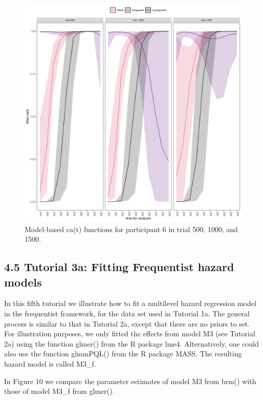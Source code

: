 \documentclass[
  man,floatsintext]{apa6}
\begin{document}
\begin{figure}[H]

{\centering \includegraphics[width=0.8\linewidth,height=0.67\textheight,]{../Tutorial_2_Bayesian/figures/M4_ca_effects_subject6} 

}

\caption{Model-based ca(t) functions for participant 6 in trial 500, 1000, and 1500.}\label{fig:plot-ca-subject6}
\end{figure}

\subsection{4.5 Tutorial 3a: Fitting Frequentist hazard models}\label{tutorial-3a-fitting-frequentist-hazard-models}

In this fifth tutorial we illustrate how to fit a multilevel hazard regression model in the frequentist framework, for the data set used in Tutorial 1a. The general process is similar to that in Tutorial 2a, except that there are no priors to set. For illustration purposes, we only fitted the effects from model M3 (see Tutorial 2a) using the function glmer() from the R package lme4. Alternatively, one could also use the function glmmPQL() from the R package MASS. The resulting hazard model is called M3\_f.

In Figure 10 we compare the parameter estimates of model M3 from brm() with those of model M3\_f from glmer().
\end{document}

